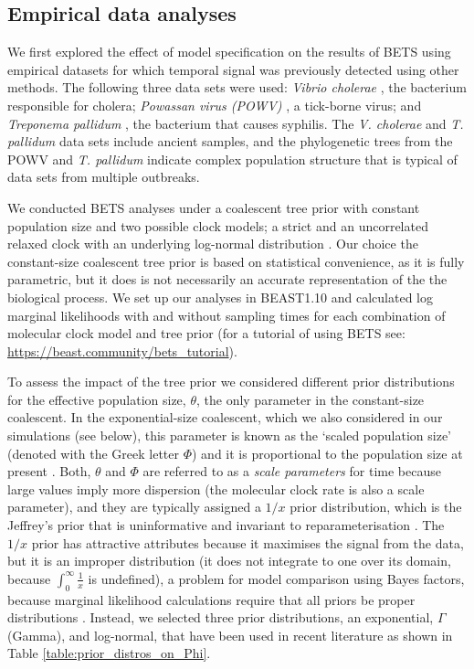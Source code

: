 \documentclass[10pt,letterpaper]{article}
\begin{document}
\subsection*{Empirical data analyses}
We first explored the effect of model specification on the results of BETS using empirical datasets for which temporal signal was previously detected using other methods. The following three data sets were used: \textit{Vibrio cholerae} \cite{devault2014second}, the bacterium responsible for cholera; \textit{Powassan virus (POWV)} \cite{majander2020ancient}, a tick-borne virus; and \textit{Treponema pallidum} \cite{vogels2023phylogeographic}, the bacterium that causes syphilis. The \textit{V. cholerae} and \textit{T. pallidum} data sets include ancient samples, and the phylogenetic trees from the POWV and \textit{T. pallidum} indicate complex population structure that is typical of data sets from multiple outbreaks. 

We conducted BETS analyses under a coalescent tree prior with constant population size and two possible clock models; a strict and an uncorrelated relaxed clock with an underlying log-normal distribution \cite{drummond2006relaxed}. Our choice the constant-size coalescent tree prior is based on statistical convenience, as it is fully parametric, but it does is not necessarily an accurate representation of the the biological process. We set up our analyses in BEAST1.10 \cite{suchard2018bayesian} and calculated log marginal likelihoods with and without sampling times for each combination of molecular clock model and tree prior (for a tutorial of using BETS see: \url{https://beast.community/bets\_tutorial}). 

To assess the impact of the tree prior we considered different prior distributions for the effective population size, $\theta$, the only parameter in the constant-size coalescent. In the exponential-size coalescent, which we also considered in our simulations (see below), this parameter is known as the `scaled population size' (denoted with the Greek letter $\Phi$) and it is proportional to the population size at present \cite{boskova2014inference}. Both, $\theta$ and $\Phi$ are referred to as a \textit{scale parameters} for time because large values imply more dispersion (the molecular clock rate is also a scale parameter), and they are typically assigned a $1/x$ prior distribution, which is the Jeffrey's prior that is uninformative and invariant to reparameterisation  \cite{drummond2002estimating}. The $1/x$ prior has attractive attributes because it maximises the signal from the data, but it is an improper distribution (it does not integrate to one over its domain, because $\int_{0}^{\infty} \frac{1}{x}$ is undefined), a problem for model comparison using Bayes factors, because marginal likelihood calculations require that all priors be proper distributions \cite{r2019marginal, baele2013proper}. Instead, we selected three prior distributions, an exponential, $\Gamma$ (Gamma), and log-normal, that have been used in recent literature as shown in Table \ref{table:prior_distros_on_Phi}.
\end{document}
